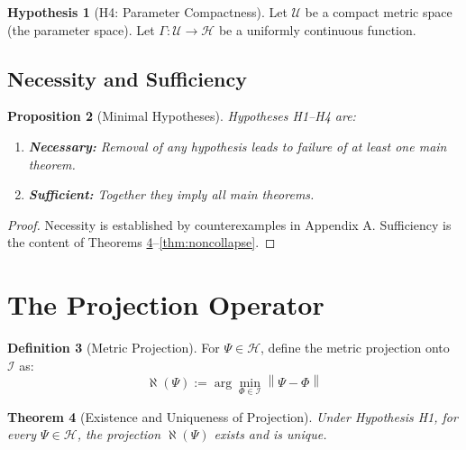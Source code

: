 \documentclass[11pt,a4paper]{article}
\theoremstyle{plain}
\newtheorem{theorem}{Theorem}[section]
\newtheorem{proposition}[theorem]{Proposition}
\theoremstyle{definition}
\newtheorem{definition}[theorem]{Definition}
\newtheorem{hypothesis}[theorem]{Hypothesis}
\newcommand{\Hilb}{\mathcal{H}}
\newcommand{\I}{\mathcal{I}}
\newcommand{\U}{\mathcal{U}}
\newcommand{\norm}[1]{\left\lVert #1 \right\rVert}
\begin{document}
\begin{hypothesis}[H4: Parameter Compactness]\label{hyp:H4}
Let $\U$ be a compact metric space (the parameter space). Let $\Gamma: \U \to \Hilb$ be a uniformly continuous function.
\end{hypothesis}

\subsection{Necessity and Sufficiency}

\begin{proposition}[Minimal Hypotheses]\label{prop:minimal}
Hypotheses H1--H4 are:
\begin{enumerate}
    \item \textbf{Necessary:} Removal of any hypothesis leads to failure of at least one main theorem.
    \item \textbf{Sufficient:} Together they imply all main theorems.
\end{enumerate}
\end{proposition}

\begin{proof}
Necessity is established by counterexamples in Appendix A. Sufficiency is the content of Theorems \ref{thm:projection}--\ref{thm:noncollapse}.
\end{proof}

\section{The Projection Operator}

\begin{definition}[Metric Projection]\label{def:projection}
For $\Psi \in \Hilb$, define the metric projection onto $\I$ as:
\[
\aleph(\Psi) := \arg\min_{\Phi \in \I} \norm{\Psi - \Phi}
\]
\end{definition}

\begin{theorem}[Existence and Uniqueness of Projection]\label{thm:projection}
Under Hypothesis H1, for every $\Psi \in \Hilb$, the projection $\aleph(\Psi)$ exists and is unique.
\end{theorem}
\end{document}
